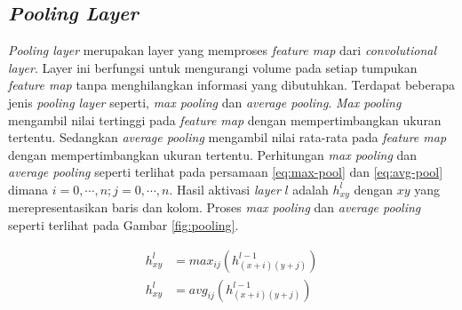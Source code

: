     \subsection{\textit{Pooling Layer}}
    \textit{Pooling layer} merupakan layer yang memproses \textit{feature map} dari \textit{convolutional layer}. Layer ini berfungsi untuk mengurangi volume pada setiap tumpukan \textit{feature map} tanpa menghilangkan informasi yang dibutuhkan. Terdapat beberapa jenis \textit{pooling layer} seperti, \textit{max pooling} dan \textit{average pooling}. \textit{Max pooling} mengambil nilai tertinggi pada \textit{feature map} dengan mempertimbangkan ukuran tertentu. Sedangkan \textit{average pooling} mengambil nilai rata-rata pada \textit{feature map} dengan mempertimbangkan ukuran tertentu. Perhitungan \textit{max pooling} dan \textit{average pooling} seperti terlihat pada persamaan \ref{eq:max-pool} dan \ref{eq:avg-pool} dimana $i=0, \cdots, n;j=0, \cdots, n$. Hasil aktivasi \textit{layer} $l$ adalah $h^{l}_{xy}$ dengan $xy$ yang merepresentasikan baris dan kolom. Proses \textit{max pooling} dan \textit{average pooling} seperti terlihat pada Gambar \ref{fig:pooling}.

    \begin{align}
        \label{eq:max-pool}
        h^{l}_{xy} &= max_{ij}(h^{l-1}_{(x+i)(y+j)})\\
        \label{eq:avg-pool}
        h^{l}_{xy} &= avg_{ij}(h^{l-1}_{(x+i)(y+j)})
    \end{align}

